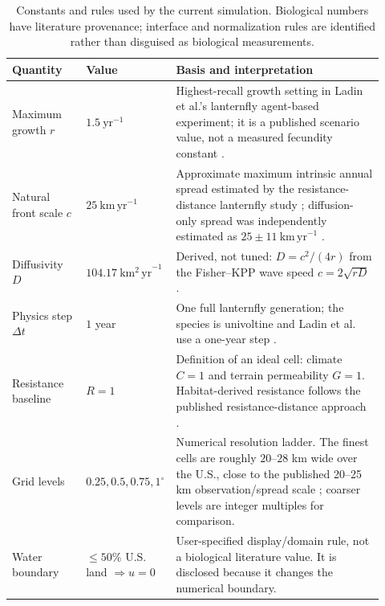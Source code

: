 \documentclass[10pt]{article}
\begin{document}
\begin{table}[h]
\centering
\caption{Constants and rules used by the current simulation.  Biological numbers have literature provenance; interface and normalization rules are identified rather than disguised as biological measurements.}
\label{tab:constants}
\scriptsize
\begin{tabular}{@{}p{0.20\linewidth}p{0.14\linewidth}p{0.58\linewidth}@{}}
\toprule
Quantity & Value & Basis and interpretation \\
\midrule
Maximum growth $r$ & $1.5~\mathrm{yr}^{-1}$ & Highest-recall growth setting in Ladin et al.'s lanternfly agent-based experiment; it is a published scenario value, not a measured fecundity constant \citep{ladin2023}. \\
Natural front scale $c$ & $25~\mathrm{km\,yr}^{-1}$ & Approximate maximum intrinsic annual spread estimated by the resistance-distance lanternfly study \citep{ruzzier2025}; diffusion-only spread was independently estimated as $25\pm11~\mathrm{km\,yr}^{-1}$ \citep{belouard2025}. \\
Diffusivity $D$ & $104.17~\mathrm{km^2\,yr}^{-1}$ & Derived, not tuned: $D=c^2/(4r)$ from the Fisher--KPP wave speed $c=2\sqrt{rD}$ \citep{fisher1937}. \\
Physics step $\Delta t$ & $1$ year & One full lanternfly generation; the species is univoltine and Ladin et al. use a one-year step \citep{ladin2023,wakie2020}. \\
Resistance baseline & $R=1$ & Definition of an ideal cell: climate $C=1$ and terrain permeability $G=1$.  Habitat-derived resistance follows the published resistance-distance approach \citep{ruzzier2025}. \\
Grid levels & $0.25,0.5,0.75,1^\circ$ & Numerical resolution ladder.  The finest cells are roughly $20$--$28$ km wide over the U.S., close to the published 20--25 km observation/spread scale \citep{zhao2024,ruzzier2025}; coarser levels are integer multiples for comparison. \\
Water boundary & $\leq50\%$ U.S. land $\Rightarrow u=0$ & User-specified display/domain rule, not a biological literature value.  It is disclosed because it changes the numerical boundary. \\
\bottomrule
\end{tabular}
\end{table}
\end{document}

